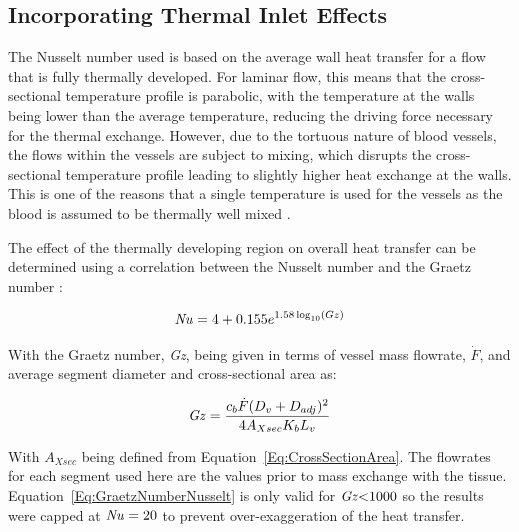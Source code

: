 \documentclass[11pt,english,a4paper,twoside,openright]{report}
\newcommand\Nuss{\mbox{\textit{Nu}}}
\newcommand\Graetz{\mbox{\textit{Gz}}}
\begin{document}
{{{{{{{{\subsection{Incorporating Thermal Inlet Effects}

The Nusselt number used is based on the average wall heat transfer for a flow that is fully thermally developed. For laminar flow, this means that the cross-sectional temperature profile is parabolic, with the temperature at the walls being lower than the average temperature, reducing the driving force necessary for the thermal exchange. However, due to the tortuous nature of blood vessels, the flows within the vessels are subject to mixing, which disrupts the cross-sectional temperature profile leading to slightly higher heat exchange at the walls. This is one of the reasons that a single temperature is used for the vessels as the blood is assumed to be thermally well mixed \cite{kotte1996description}. 

The effect of the thermally developing region on overall heat transfer can be determined using a correlation between the Nusselt number and the Graetz number \cite{peattie2012transport}:

\begin{equation}
\Nuss = 4 + 0.155e^{1.58\log_{10}(Gz)}
\label{Eq:GraetzNumberNusselt}
\end{equation} 

With the Graetz number, \Graetz, being given in terms of vessel mass flowrate, $\dot{F}$, and average segment diameter and cross-sectional area as:

\begin{equation}
\Graetz = \frac{c_{b}\dot{F}(D_{v}+D_{adj})^{2}}{4A_{Xsec}K_{b}L_{v}}
\label{Eq:GraetzNumber}
\end{equation} 

With $A_{Xsec}$ being defined from Equation~\ref{Eq:CrossSectionArea}. The flowrates for each segment used here are the values prior to mass exchange with the tissue. Equation~\ref{Eq:GraetzNumberNusselt} is only valid for $\Graetz{<}1000$ so the results were capped at $\Nuss=20$ to prevent over-exaggeration of the heat transfer.

}}}}}}}}
\end{document}
